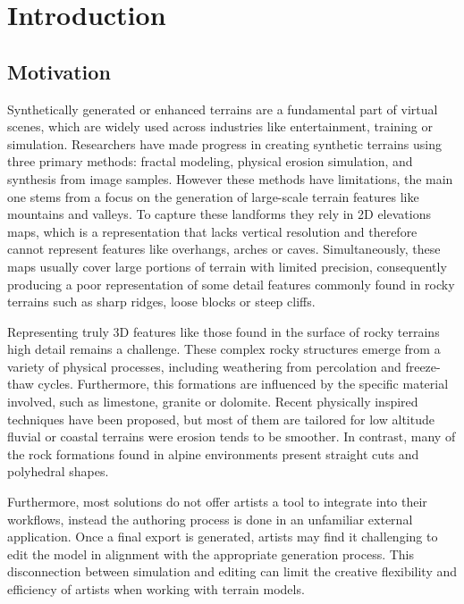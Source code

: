 \chapter{Introduction}\label{chapter:introduction}

\section{Motivation}

Synthetically generated or enhanced terrains are a fundamental part of virtual scenes, which are widely used across industries like entertainment, training or simulation. Researchers have made progress in creating synthetic terrains using three primary methods: fractal modeling, physical erosion simulation, and synthesis from image samples. However these methods have limitations, the main one stems from a focus on the generation of large-scale terrain features like mountains and valleys. To capture these landforms they rely in 2D elevations maps, which is a representation that lacks vertical resolution and therefore cannot represent features like overhangs, arches or caves. Simultaneously, these maps usually cover large portions of terrain with limited precision, consequently producing a poor representation of some detail features commonly found in rocky terrains such as sharp ridges, loose blocks or steep cliffs.

\vspace{0.5\baselineskip}
Representing truly 3D features like those found in the surface of rocky terrains high detail remains a challenge. These complex rocky structures emerge from a variety of physical processes, including weathering from percolation and freeze-thaw cycles. Furthermore, this formations are influenced by the specific material involved, such as limestone, granite or dolomite. Recent physically inspired techniques have been proposed, but most of them are tailored for low altitude fluvial or coastal terrains were erosion tends to be smoother. In contrast, many of the rock formations found in alpine environments present straight cuts and polyhedral shapes.

\vspace{0.5\baselineskip}
Furthermore, most solutions do not offer artists a tool to integrate into their workflows, instead the authoring process is done in an unfamiliar external application. Once a final export is generated, artists may find it challenging to edit the model in alignment with the appropriate generation process. This disconnection between simulation and editing can limit the creative flexibility and efficiency of artists when working with terrain models.

